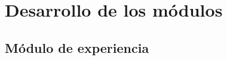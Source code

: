 
\chapter{Desarrollo de los módulos}\label{mod:concentrado}

    \section{Módulo de experiencia}\label{mod:exp}
    





